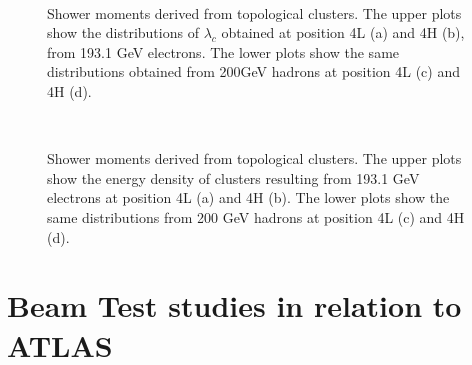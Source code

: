 \begin{figure}[!htb]
\begin{centering}
\\
\caption[Shower moments, $\lambda_c$]{Shower moments derived from topological clusters. The upper plots show the distributions of $\lambda_c$ obtained at position 4L (a) and 4H (b), from 193.1 GeV electrons. The lower plots show the same distributions obtained from 200GeV hadrons at position 4L (c) and 4H (d).} 
\label{LC_moments_lambdac}
\end{centering}
\end{figure}
\begin{figure}[!htb]
\begin{centering}
\\
\caption[Shower moments, energy density]{Shower moments derived from topological clusters. The upper plots show the energy density of clusters resulting from 193.1 GeV electrons at position 4L (a) and 4H (b). The lower plots show the same distributions from 200 GeV hadrons at position 4L (c) and 4H (d). } 
\label{LC_moments_Edens}
\end{centering}
\end{figure}
\clearpage
\section{Beam Test studies in relation to ATLAS}

